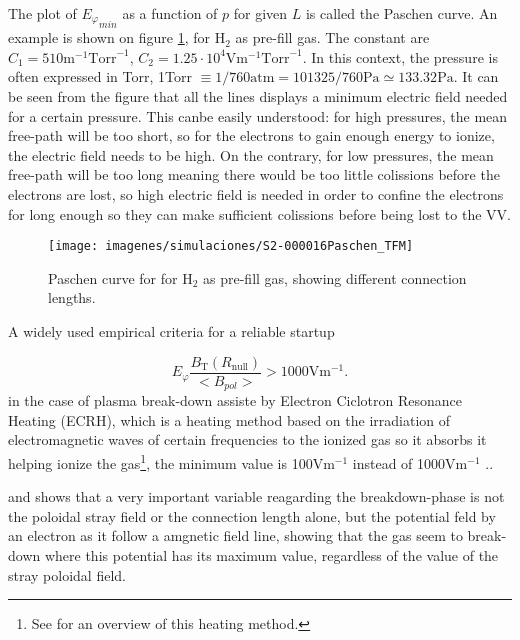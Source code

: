 \documentclass[a4paper,12pt,oneside]{book}
\begin{document}
The plot of ${E_\varphi}_{min}$ as a function of $p$ for given $L$ is called the Paschen curve. An example is shown on figure \ref{fig_Paschen_ejemplo}, for H$_2$ as pre-fill gas. The constant are $C_1=510 \text{m}^{-1} \text{Torr}^{-1}$, $C_2=1.25 \cdot 10^4 \text{V} \text{m}^{-1} \text{Torr}^{-1}$.  In this context, the pressure is often expressed in Torr, 1Torr $\equiv 1/760 \text{atm}=101325/760 \text{Pa} \simeq 133.32 \text{Pa}$. It can be seen from the figure that all the lines displays a minimum electric field needed for a certain pressure. This canbe easily understood: for high pressures, the mean free-path will be too short, so for the electrons to gain enough energy to ionize, the electric field needs to be high. On the contrary, for low pressures, the mean free-path will be too long meaning there would be too little colissions before the electrons are lost, so high electric field is needed in order to confine the electrons for long enough so they can make sufficient colissions before being lost to the VV.

\begin{figure}[htbp]
\centering
\texttt{[image: imagenes/simulaciones/S2-000016Paschen\_TFM]}
\caption{Paschen curve for for H$_2$ as pre-fill gas, showing different connection lengths.}
\label{fig_Paschen_ejemplo}
\end{figure}


A widely used empirical criteria for a reliable startup \cite{ITER_1999}

\begin{equation}
E_\varphi \dfrac{B_\text{T}(R_{\text{null}})}{<B_{pol}>} >1000 \text{V}\text{m}^{-1}.
\end{equation}
in the case of plasma break-down assiste by Electron Ciclotron Resonance Heating (ECRH), which is a heating method based on the irradiation of electromagnetic waves of certain frequencies to the ionized gas so it absorbs it helping ionize the gas\footnote{See \cite{ITER_2019} for an overview of this heating method.}, the minimum value is 100$\text{V}\text{m}^{-1}$ instead of 1000$\text{V}\text{m}^{-1}$ \cite{VEST_2015}..

\cite{Lazarus_1998} and \cite{NSTX_2017} shows that a very important variable reagarding the breakdown-phase is not the poloidal stray field or the connection length alone, but the potential feld by an electron as it follow a amgnetic field line, showing that the gas seem to break-down where this potential has its maximum value, regardless of the value of the stray poloidal field.
\end{document}
